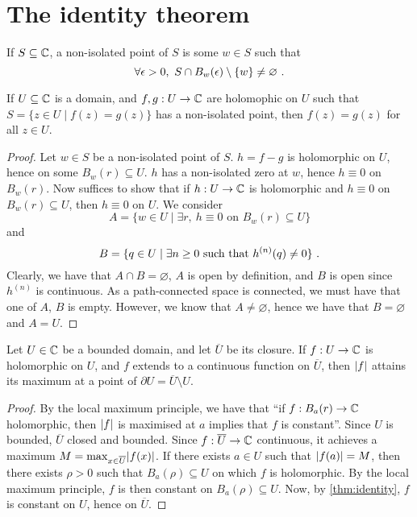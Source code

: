\section{The identity theorem}


\begin{definition}
If $S \subseteq \mathbb{C}$, a non-isolated point of $S$ is some $w \in S$ such that
\[
\forall \epsilon > 0, \ S \cap B_w(\epsilon) \setminus \{ w \} \neq \varnothing \ \text{.}
\]
\end{definition}

\begin{theorem}[name=Identity theorem,label=thm:identity]
If $U \subseteq \mathbb{C}$ is a domain, and $f, g : U \rightarrow \mathbb{C}$ are holomophic on $U$ such that $S = \{ z \in U \mid f(z) = g(z) \}$ has a non-isolated point, then $f(z) = g(z)$ for all $z \in U$.
\end{theorem}

\begin{proof}
Let $w \in S$ be a non-isolated point of $S$. $h = f - g$ is holomorphic on $U$, hence on some $B_w(r) \subseteq U$.
$h$ has a non-isolated zero at $w$, hence $h \equiv 0$ on $B_w(r)$.
Now suffices to show that if $h : U \rightarrow \mathbb{C}$ is holomorphic and $h \equiv 0$ on $B_w(r) \subseteq U$, then $h \equiv 0$ on $U$.
We consider
\[
A = \{ w \in U \mid \exists r, \ h \equiv 0 \text{ on } B_w(r) \subseteq U \}
\]
and
\[
B = \{ q \in U \mid \exists n \geq 0 \text{ such that } h^{(n)}(q) \neq 0 \} \ \text{.}
\]
Clearly, we have that $A \cap B = \varnothing$, $A$ is open by definition, and $B$ is open since $h^{(n)}$ is continuous.
As a path-connected space is connected, we must have that one of $A$, $B$ is empty.
However, we know that $A \neq \varnothing$, hence we have that $B = \varnothing$ and $A = U$.

\end{proof}

\begin{corollary}
  Let $U \in \mathbb{C}$ be a bounded domain, and let $\overline{U}$ be its closure.
If $f : U \rightarrow \mathbb{C}$ is holomorphic on $U$, and $f$ extends to a continuous function on $\overline{U}$, then $\lvert f\rvert$ attains its maximum at a point of $\partial U = \overline{U} \setminus U$.
\end{corollary}


\begin{proof}
By  the local maximum principle, we have that ``if $f : B_a(r) \rightarrow \mathbb{C}$ holomorphic, then $\lvert f\rvert$ is maximised at $a$ implies that $f$ is constant''.
Since $U$ is bounded, $\overline{U}$ closed and bounded. Since $f : \overline{U} \rightarrow \mathbb{C}$ continuous, it achieves a maximum $M = \max_{x \in \overline{U}} \lvert f(x)\rvert$.
If there exists $a \in U$ such that $\lvert f(a)\rvert = M$, then there exists $\rho > 0$ such that $B_a(\rho) \subseteq U$ on which $f$ is holomorphic.
By the local maximum principle, $f$ is then constant on $B_a(\rho) \subseteq U$.
Now, by \cref{thm:identity}, $f$ is constant on $U$, hence on $\overline{U}$.
\end{proof}

